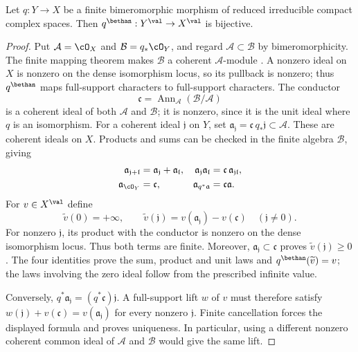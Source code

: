 \begin{lemma}\label{lem:ts-finite-bimeromorphic}
Let $q:Y\to X$ be a finite bimeromorphic morphism of reduced irreducible
compact complex spaces. Then $q^\bethan:Y^{\val}\to X^{\val}$ is bijective.
\end{lemma}

\begin{proof}
Put $\mathcal A=\cO_X$ and $\mathcal B=q_*\cO_Y$, and regard
$\mathcal A\subset\mathcal B$ by bimeromorphicity. The finite mapping
theorem makes $\mathcal B$ a coherent $\mathcal A$-module
\cite[Chapter~3, \S1]{CAS}. A nonzero ideal on $X$ is nonzero on the
dense isomorphism locus, so its pullback is nonzero; thus $q^\bethan$
maps full-support characters to full-support characters. The conductor
\[
 \mathfrak c=\operatorname{Ann}_{\mathcal A}(\mathcal B/\mathcal A)
\]
is a coherent ideal of both $\mathcal A$ and $\mathcal B$; it is nonzero,
since it is the unit ideal where $q$ is an isomorphism. For a coherent
ideal $\mathfrak j$ on $Y$, set
$\mathfrak a_{\mathfrak j}=\mathfrak c\,q_*\mathfrak j\subset\mathcal A$.
These are coherent ideals on $X$. Products and sums can be checked in
the finite algebra $\mathcal B$, giving
\[
\begin{aligned}
 \mathfrak a_{\mathfrak j+\mathfrak l}
   &=\mathfrak a_{\mathfrak j}+\mathfrak a_{\mathfrak l},&
 \mathfrak a_{\mathfrak j}\mathfrak a_{\mathfrak l}
   &=\mathfrak c\,\mathfrak a_{\mathfrak j\mathfrak l},\\
 \mathfrak a_{\cO_Y}&=\mathfrak c,&
 \mathfrak a_{q^*\mathfrak a}&=\mathfrak c\mathfrak a.
\end{aligned}
\]
For $v\in X^{\val}$ define
\[
 \widetilde v(0)=+\infty,\qquad
 \widetilde v(\mathfrak j)
   =v(\mathfrak a_{\mathfrak j})-v(\mathfrak c)
       \quad(\mathfrak j\ne0).
\]
For nonzero $\mathfrak j$, its product with the conductor is nonzero on
the dense isomorphism locus. Thus both terms are finite. Moreover,
$\mathfrak a_{\mathfrak j}\subset\mathfrak c$ proves
$\widetilde v(\mathfrak j)\geq0$. The four identities prove the sum,
product and unit laws and $q^\bethan(\widetilde v)=v$; the laws involving
the zero ideal follow from the prescribed infinite value.

Conversely, $q^*\mathfrak a_{\mathfrak j}
=(q^*\mathfrak c)\mathfrak j$. A full-support lift $w$ of $v$ must
therefore satisfy
$w(\mathfrak j)+v(\mathfrak c)=v(\mathfrak a_{\mathfrak j})$ for every
nonzero $\mathfrak j$. Finite cancellation forces the displayed formula
and proves uniqueness. In particular, using a different nonzero coherent
common ideal of $\mathcal A$ and $\mathcal B$ would give the same lift.
\end{proof}

